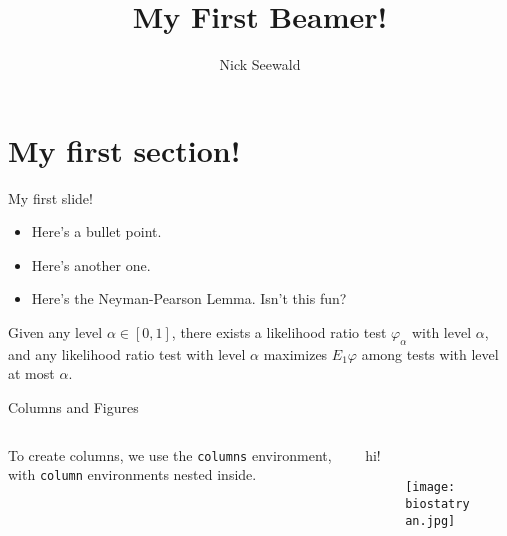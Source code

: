 \documentclass{beamer}
\title[An Alternate Title]{My First Beamer!}
\author{Nick Seewald}
\institute{University of Michigan}
\begin{document}
	\begin{frame}
		\titlepage
	\end{frame}
	
	\section{My first section!}
	\begin{frame}{My first slide!}	
		\begin{itemize}
			\item Here's a bullet point.
			\item Here's another one.
			\pause
			\item Here's the Neyman-Pearson Lemma. Isn't this fun?
		\end{itemize}
			\begin{theorem}
				Given any level $\alpha\in [0,1]$, there exists a likelihood ratio test $\varphi_{\alpha}$ with level $\alpha$, and any likelihood ratio test with level $\alpha$ maximizes $E_{1}\varphi$ among tests with level at most $\alpha$. 
			\end{theorem}
	\end{frame}
	
	\begin{frame}{Columns and Figures}
		\begin{columns}
			\begin{column}{.5\textwidth}
				To create columns, we use the \texttt{columns} environment, with \texttt{column} environments nested inside.
			\end{column}
			\begin{column}{.5\textwidth}
				hi!
				\begin{figure}[h]
					\texttt{[image: biostatryan.jpg]}
				\end{figure}
			\end{column}
		\end{columns}
	\end{frame}
	
\end{document}
